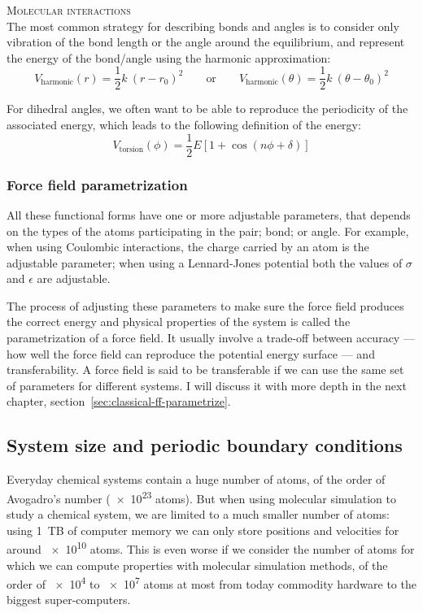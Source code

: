 \documentclass[thesis]{subfiles}
\begin{document}
\textsc{Molecular interactions}\\[0.1\baselineskip]
The most common strategy for describing bonds and angles is to consider only
vibration of the bond length or the angle around the equilibrium, and represent
the energy of the bond/angle using the harmonic approximation:
\[V_\text{harmonic}(r) = \frac 12 k \ (r - r_0)^2 \qquad\text{or}\qquad V_\text{harmonic}(\theta) = \frac 12 k \ (\theta - \theta_0)^2 \]

For dihedral angles, we often want to be able to reproduce the periodicity of
the associated energy, which leads to the following definition of the energy:
\[V_\text{torsion}(\phi) = \frac 12 E \left[1 + \cos(n \phi + \delta)\right] \]

\subsubsection{Force field parametrization}

All these functional forms have one or more adjustable parameters, that depends
on the types of the atoms participating in the pair; bond; or angle. For
example, when using Coulombic interactions, the charge carried by an atom is the
adjustable parameter; when using a Lennard-Jones potential both the values of
$\sigma$ and $\epsilon$ are adjustable.

The process of adjusting these parameters to make sure the force field produces
the correct energy and physical properties of the system is called the
parametrization of a force field. It usually involve a trade-off between
accuracy --- \ie how well the force field can reproduce the potential energy
surface --- and transferability. A force field is said to be transferable if we
can use the same set of parameters for different systems. I will discuss it with
more depth in the next chapter, section~\ref{sec:classical-ff-parametrize}.

\subsection{System size and periodic boundary conditions}

Everyday chemical systems contain a huge number of atoms, of the order of
Avogadro's number (\SI{e23}{} atoms). But when using molecular simulation to
study a chemical system, we are limited to a much smaller number of atoms: using
\SI{1}{TB} of computer memory we can only store positions and velocities for
around \SI{e10}{} atoms. This is even worse if we consider the number of atoms
for which we can compute properties with molecular simulation methods, of the
order of \SI{e4}{} to \SI{e7}{} atoms at most from today commodity hardware to
the biggest super-computers.
\end{document}
